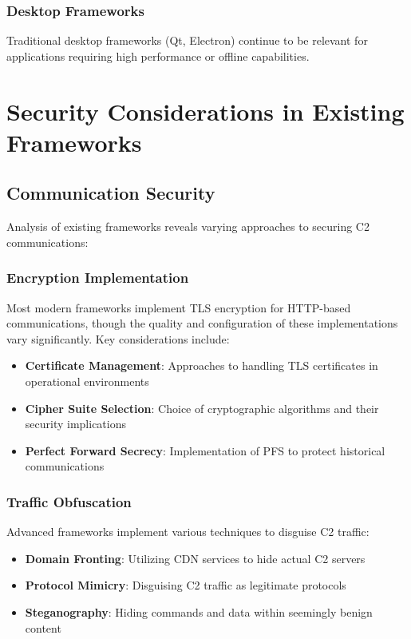 \subsubsection{Desktop Frameworks}

Traditional desktop frameworks (Qt, Electron) continue to be relevant for applications requiring high performance or offline capabilities.

\section{Security Considerations in Existing Frameworks}
\label{sec:security_considerations}

\subsection{Communication Security}
\label{subsec:communication_security}

Analysis of existing frameworks reveals varying approaches to securing C2 communications:

\subsubsection{Encryption Implementation}

Most modern frameworks implement TLS encryption for HTTP-based communications, though the quality and configuration of these implementations vary significantly. Key considerations include:

\begin{itemize}
\item \textbf{Certificate Management}: Approaches to handling TLS certificates in operational environments
\item \textbf{Cipher Suite Selection}: Choice of cryptographic algorithms and their security implications
\item \textbf{Perfect Forward Secrecy}: Implementation of PFS to protect historical communications
\end{itemize}

\subsubsection{Traffic Obfuscation}

Advanced frameworks implement various techniques to disguise C2 traffic:

\begin{itemize}
\item \textbf{Domain Fronting}: Utilizing CDN services to hide actual C2 servers
\item \textbf{Protocol Mimicry}: Disguising C2 traffic as legitimate protocols
\item \textbf{Steganography}: Hiding commands and data within seemingly benign content
\end{itemize}

